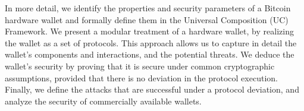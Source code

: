 In more detail, we identify the properties and security parameters of a Bitcoin
hardware wallet and formally define them in the Universal Composition (UC)
Framework. We present a modular treatment of a hardware wallet, by realizing
the wallet as a set of protocols.  This approach allows us to capture in detail
the wallet's components and interactions, and the potential threats. We deduce
the wallet's security by proving that it is secure under common cryptographic
assumptions, provided that there is no deviation in the protocol execution.
Finally, we define the attacks that are successful under a protocol deviation,
and analyze the security of commercially available wallets.
